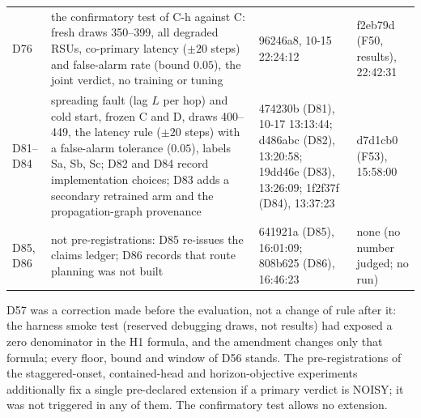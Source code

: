\begin{table}[t]
\begin{tabular}{@{}lp{6.6cm}p{3.3cm}p{4.4cm}@{}}
D76 & the confirmatory test of C-h against C: fresh draws 350--399, all degraded RSUs, co-primary latency ($\pm 20$ steps) and false-alarm rate (bound $0.05$), the joint verdict, no training or tuning & 96246a8, 10-15 22:24:12 & f2eb79d (F50, results), 22:42:31 \\
D81--D84 & spreading fault (lag $L$ per hop) and cold start, frozen C and D, draws 400--449, the latency rule ($\pm 20$ steps) with a false-alarm tolerance ($0.05$), labels Sa, Sb, Sc; D82 and D84 record implementation choices; D83 adds a secondary retrained arm and the propagation-graph provenance & 474230b (D81), 10-17 13:13:44; d486abc (D82), 13:20:58; 19dd46e (D83), 13:26:09; 1f2f37f (D84), 13:37:23 & d7d1cb0 (F53), 15:58:00 \\
D85, D86 & not pre-registrations: D85 re-issues the claims ledger; D86 records that route planning was not built & 641921a (D85), 16:01:09; 808b625 (D86), 16:46:23 & none (no number judged; no run) \\
\bottomrule
\end{tabular}
\end{table}

D57 was a correction made before the evaluation, not a change of rule after it: the harness smoke test (reserved debugging draws, not results) had exposed a zero denominator in the H1 formula, and the amendment changes only that formula; every floor, bound and window of D56 stands.
The pre-registrations of the staggered-onset, contained-head and horizon-objective experiments additionally fix a single pre-declared extension if a primary verdict is NOISY; it was not triggered in any of them. The confirmatory test allows no extension.


